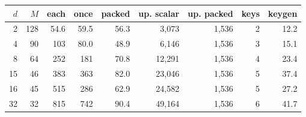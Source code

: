 \begin{tabular}{rrrrrrrrr}
\hline
$d$ & $M$ & each & once & packed & up. scalar & up. packed & keys & keygen \\
\hline
2 & 128 & 54.6 & 59.5 & 56.3 & 3,073 & 1,536 & 2 & 12.2 \\
4 & 90 & 103 & 80.0 & 48.9 & 6,146 & 1,536 & 3 & 15.1 \\
8 & 64 & 252 & 181 & 70.8 & 12,291 & 1,536 & 4 & 23.4 \\
15 & 46 & 383 & 363 & 82.0 & 23,046 & 1,536 & 5 & 37.4 \\
16 & 45 & 515 & 286 & 62.9 & 24,582 & 1,536 & 5 & 27.2 \\
32 & 32 & 815 & 742 & 90.4 & 49,164 & 1,536 & 6 & 41.7 \\
\hline
\end{tabular}
